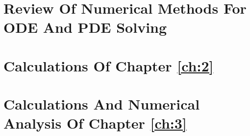 \documentclass[12pt]{report}
\begin{document}
\begin{appendices}

\chapter{Review Of Numerical Methods For ODE And PDE Solving}

\chapter{Calculations Of Chapter \ref{ch:2}}

\chapter{Calculations And Numerical Analysis Of Chapter \ref{ch:3}}







\end{appendices}


\newpage
\printbibliography 
\end{document}
